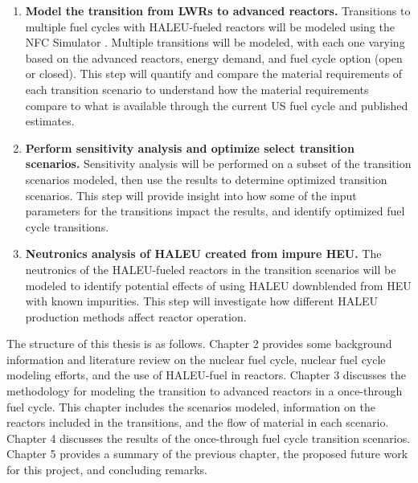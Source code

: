 \vspace{0.2cm} 
\noindent
\begin{enumerate}
\item \textbf{Model the transition from \glspl{LWR} to advanced reactors.} 
Transitions to multiple fuel cycles with \gls{HALEU}-fueled reactors will 
be modeled using the \gls{NFC} Simulator \Cyclus \cite{huff_fundamental_2016}. 
Multiple transitions will be modeled, with each one varying based on the 
advanced reactors, energy demand, and fuel cycle option (open or closed). This 
step will quantify and compare the material requirements of each transition 
scenario to understand how the material requirements compare to what is available 
through the current US fuel cycle and published estimates. 

\item \textbf{Perform sensitivity analysis and optimize select transition scenarios.}
Sensitivity analysis will be performed on a subset of the transition scenarios
modeled, then use the results to determine optimized transition scenarios. This 
step will provide insight into how some of the input parameters for the transitions 
impact the results, and identify optimized fuel cycle transitions.

\item \textbf{Neutronics analysis of \gls{HALEU} created from impure \gls{HEU}.}
The neutronics of the \gls{HALEU}-fueled reactors in the transition scenarios will
be modeled to identify potential effects of using \gls{HALEU} downblended from 
\gls{HEU} with known impurities. This step will investigate how different 
\gls{HALEU} production methods affect reactor operation.
\end{enumerate}


The structure of this thesis is as follows. Chapter 2 provides some 
background information and literature review on the nuclear fuel cycle,
nuclear fuel cycle 
modeling efforts, and the use of \gls{HALEU}-fuel in reactors.
Chapter 3 discusses the methodology for modeling the transition to advanced 
reactors in a once-through fuel cycle. This chapter includes the scenarios
modeled, information on the reactors included in the transitions, and the 
flow of 
material in each scenario. Chapter 4 discusses the results of the 
once-through fuel cycle transition scenarios. Chapter 5 provides a summary
of the previous chapter, the proposed future work for this project, and 
concluding remarks. 